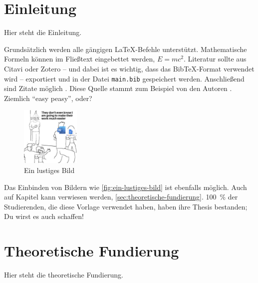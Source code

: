 \documentclass[11pt]{article}
\begin{document}
\makecover

\maketoc

\section{Einleitung}
\label{sec:einleitung}

Hier steht die Einleitung.

Grundsätzlich werden alle gängigen \LaTeX-Befehle unterstützt.
Mathematische Formeln können im Fließtext eingebettet werden, \zB $E = mc^2$.
Literatur sollte aus Citavi oder Zotero -- und dabei ist es wichtig, dass das BibTeX-Format verwendet wird -- exportiert und in der Datei \texttt{main.bib} gespeichert werden.
Anschließend sind Zitate möglich \autocite[S.\,2--5]{haider_realization_2021}.
Diese Quelle stammt zum Beispiel von den Autoren \citeauthor{haider_realization_2021}.
Ziemlich \enquote{easy peasy}, oder?

\begin{figure}[h]

  \centering

  \includegraphics[width=0.25\textwidth]{images/image.jpg}

  \caption[Ein lustiges Bild]{Ein lustiges Bild \autocite{illisioun_latex_2021}}

  \label{fig:ein-lustiges-bild}

\end{figure}

Das Einbinden von Bildern wie \autoref{fig:ein-lustiges-bild} ist ebenfalls möglich.
Auch auf Kapitel kann verwiesen werden, \zB \autoref{sec:theoretische-fundierung}.
100~\% der Studierenden, die diese Vorlage verwendet haben, haben ihre Thesis bestanden;
\dash Du wirst es auch schaffen!

\clearpage

\section{Theoretische Fundierung}
\label{sec:theoretische-fundierung}

Hier steht die theoretische Fundierung.
\end{document}
